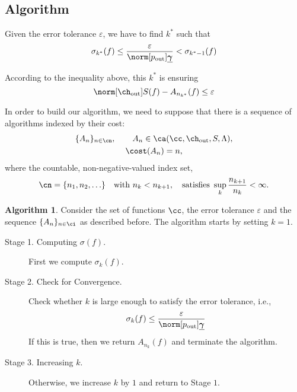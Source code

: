 \documentclass[final]{elsarticle}
\newcommand{\chout}{\ch_{\text{\rm{out}}}}
\newcommand{\pout}{p_{\text{\rm{out}}}}
\newcommand{\bgamma}{\underline{\boldsymbol\gamma}}
\theoremstyle{definition}
\newtheorem{algo}{Algorithm}
\theoremstyle{remark}
\begin{document}
\subsection{Algorithm}

Given the error tolerance $\varepsilon$, we have to find $k^*$ such that
\begin{equation*}
         \sigma_{k^*}(f) \le \frac{\varepsilon}{\norm[\pout]{\bgamma}} < \sigma_{k^*-1}(f)
\end{equation*}

According to the inequality above, this $k^*$ is ensuring
\begin{equation*}
\norm[\chout]{S(f)-A_{n_{k^*}}(f)} \le \varepsilon
\end{equation*}

In order to build our algorithm, we need to suppose that there is a sequence of algorithms indexed by their cost:
\begin{subequations} \label{algseqdef}
\begin{gather}
\{A_n\}_{n \in \cn}, \qquad A_n  \in \ca(\cc,\chout,S,\Lambda), \\
\cost(A_n) = n,
\end{gather}
\end{subequations}
where the countable, non-negative-valued index set,
\begin{equation} \label{indexdef}
\cn=\{n_1, n_2, \ldots\} \quad \text{with } n_k < n_{k+1}, \quad \text{satisfies } \sup_k \frac{n_{k+1}}{n_k} <\infty.
\end{equation}

\begin{algo}\label{algo2}
 Consider the set of functions $\cc$, the error tolerance $\varepsilon$ and the sequence $\{A_n\}_{n \in \ci}$ as described before.
The algorithm starts by setting $k=1$.
\begin{description}
\item[Stage 1. Computing $\sigma(f)$.] First we compute $\sigma_{k}(f)$.
\item[Stage 2. Check for Convergence.] Check whether $k$ is large enough to satisfy the error tolerance, i.e.,
    \begin{equation}
          \sigma_{k}(f) \le \frac{\varepsilon}{\norm[\pout]{\bgamma}}
    \end{equation}
    If this is true, then we return $A_{n_{k}}(f)$ and terminate the algorithm.
\item[Stage 3. Increasing $k$.] Otherwise, we increase $k$ by $1$ and return to Stage $1$.
\end{description}
\end{algo}
\end{document}

